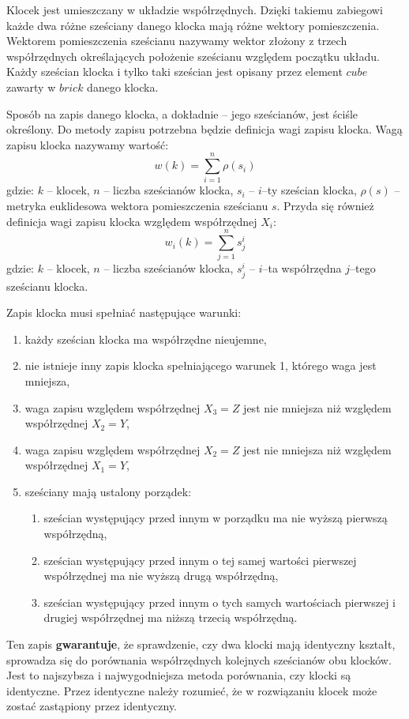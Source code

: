 \documentclass[12pt]{article}
\begin{document}
Klocek jest
umieszczany w układzie współrzędnych. Dzięki takiemu zabiegowi każde dwa
różne sześciany danego klocka mają różne wektory pomieszczenia. Wektorem
pomieszczenia sześcianu nazywamy wektor złożony z trzech współrzędnych
określających położenie sześcianu względem początku układu. Każdy
sześcian klocka i tylko taki sześcian jest opisany przez element $cube$
zawarty w $brick$ danego klocka.

Sposób na zapis danego klocka, a dokładnie -- jego sześcianów, jest ściśle
określony. Do metody zapisu potrzebna będzie definicja wagi zapisu klocka.
Wagą zapisu klocka nazywamy wartość:
\begin{equation}
	w(k) = \sum_{i=1}^n \rho (s_i)
\end{equation}
gdzie:
$k$ -- klocek,
$n$ -- liczba sześcianów klocka,
$s_i$ -- $i$--ty sześcian klocka,
$\rho (s)$ -- metryka euklidesowa wektora pomieszczenia sześcianu $s$.
Przyda się również definicja wagi zapisu klocka względem współrzędnej
$X_i$:
\begin{equation}
	w_i(k) = \sum_{j=1}^n s_j^i
\end{equation}
gdzie:
$k$ -- klocek,
$n$ -- liczba sześcianów klocka,
$s_j^i$ -- $i$--ta współrzędna $j$--tego sześcianu klocka.

Zapis klocka musi spełniać następujące warunki:
\begin{enumerate}
	\item każdy sześcian klocka ma współrzędne nieujemne,
	\item nie istnieje inny zapis klocka spełniającego warunek 1, którego
		waga jest mniejsza,
	\item waga zapisu względem współrzędnej $X_3=Z$ jest nie mniejsza niż 
		względem współrzędnej $X_2=Y$,
	\item waga zapisu względem współrzędnej $X_2=Z$ jest nie mniejsza niż 
		względem współrzędnej $X_1=Y$,
	\item sześciany mają ustalony porządek:
		\begin{enumerate}
			\item sześcian występujący przed innym w porządku ma nie wyższą
				pierwszą współrzędną,
			\item sześcian występujący przed innym o tej samej wartości
				pierwszej współrzędnej ma nie wyższą drugą współrzędną,
			\item sześcian występujący przed innym o tych samych wartościach
				pierwszej i drugiej współrzędnej ma niższą trzecią współrzędną.
		\end{enumerate}
\end{enumerate}
Ten zapis \textbf{gwarantuje}, że sprawdzenie, czy dwa klocki mają
identyczny kształt, sprowadza się do porównania współrzędnych kolejnych
sześcianów obu klocków. Jest to najszybsza i najwygodniejsza metoda
porównania, czy klocki są identyczne. Przez identyczne należy rozumieć,
że w rozwiązaniu klocek może zostać zastąpiony przez identyczny.
\end{document}
